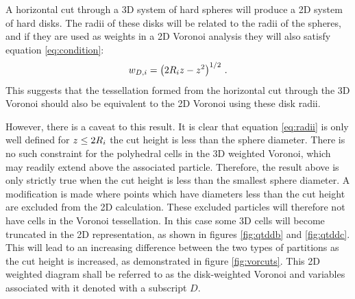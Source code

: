 A horizontal cut through a 3D system of hard spheres will produce a 2D system of hard disks.
The radii of these disks will be related to the radii of the spheres, and if they are used as weights in a 2D Voronoi analysis they will also satisfy equation \eqref{eq:condition}:
\begin{equation}
	\label{eq:radii}
	w_{D,i}  = \left(2R_i z-z^2\right)^{1/2}\,.
\end{equation}
This suggests that the tessellation formed from the horizontal cut through the 3D Voronoi should also be equivalent to the 2D Voronoi using these disk radii.

However, there is a caveat to this result. 
It is clear that equation \eqref{eq:radii} is only well defined for $z\leq 2R_i$ \ie{} the cut height is less than the sphere diameter.
There is no such constraint for the polyhedral cells in the 3D weighted Voronoi, which may readily extend above the associated particle.
Therefore, the result above is only strictly true when the cut height is less than the smallest sphere diameter.
A modification is made where points which have diameters less than the cut height are excluded from the 2D calculation.
These excluded particles will therefore not have cells in the Voronoi tessellation.
In this case some 3D cells will become truncated in the 2D representation, as shown in figures \ref{fig:qtddb} and \ref{fig:qtddc}.
This will lead to an increasing difference between the two types of partitions as the cut height is increased, as demonstrated in figure \ref{fig:vorcuts}.
This 2D weighted diagram shall be referred to as the disk\--weighted Voronoi and variables associated with it denoted with a subscript $D$.

